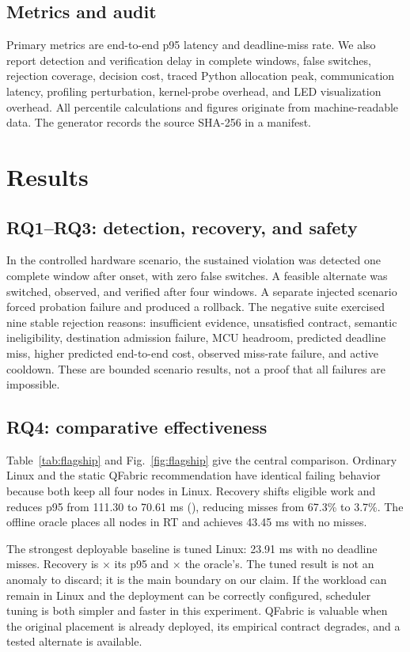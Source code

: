 \documentclass[conference]{IEEEtran}
\newcommand{\system}{QFabric\xspace}
\begin{document}
\subsection{Metrics and audit}
Primary metrics are end-to-end p95 latency and deadline-miss rate. We also
report detection and verification delay in complete windows, false switches,
rejection coverage, decision cost, traced Python allocation peak,
communication latency, profiling perturbation, kernel-probe overhead, and LED
visualization overhead. All percentile calculations and figures originate from
machine-readable data. The generator records the source SHA-256 in a manifest.

\section{Results}
\subsection{RQ1--RQ3: detection, recovery, and safety}
In the controlled hardware scenario, the sustained violation was detected one
complete window after onset, with zero false switches. A feasible alternate
was switched, observed, and verified after four windows. A separate injected
scenario forced probation failure and produced a rollback. The negative suite
exercised nine stable rejection reasons: insufficient evidence, unsatisfied
contract, semantic ineligibility, destination admission failure, MCU headroom,
predicted deadline miss, higher predicted end-to-end cost, observed miss-rate
failure, and active cooldown. These are bounded scenario results, not a proof
that all failures are impossible.

\subsection{RQ4: comparative effectiveness}
Table~\ref{tab:flagship} and Fig.~\ref{fig:flagship} give the central comparison.
Ordinary Linux and the static \system recommendation have identical failing
behavior because both keep all four nodes in Linux. Recovery shifts eligible
work and reduces p95 from 111.30 to 70.61 ms (\RecoveryImprovement), reducing
misses from 67.3\% to 3.7\%. The offline oracle places all nodes in RT and
achieves 43.45 ms with no misses.

The strongest deployable baseline is tuned Linux: 23.91 ms with no deadline
misses. Recovery is \RecoveryTunedRatio$\times$ its p95 and
\RecoveryOracleRatio$\times$ the oracle's. The tuned result is not an anomaly to
discard; it is the main boundary on our claim. If the workload can remain in
Linux and the deployment can be correctly configured, scheduler tuning is both
simpler and faster in this experiment. \system is valuable when the original
placement is already deployed, its empirical contract degrades, and a tested
alternate is available.
\end{document}
